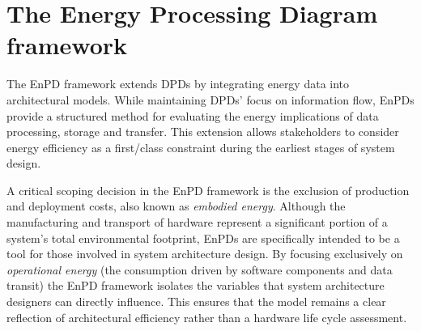 \documentclass[11pt,a4paper]{article}
\begin{document}
\section{The Energy Processing Diagram framework}
The EnPD framework extends DPDs by integrating energy data into architectural models.
While maintaining DPDs' focus on information flow, EnPDs provide a structured method for evaluating the energy implications of data processing, storage and transfer.
This extension allows stakeholders to consider energy efficiency as a first\-/class constraint during the earliest stages of system design.

A critical scoping decision in the EnPD framework is the exclusion of production and deployment costs, also known as \emph{embodied energy}.
Although the manufacturing and transport of hardware represent a significant portion of a system's total environmental footprint, EnPDs are specifically intended to be a tool for those involved in system architecture design.
By focusing exclusively on \emph{operational energy} (the consumption driven by software components and data transit) the EnPD framework isolates the variables that system architecture designers can directly influence.
This ensures that the model remains a clear reflection of architectural efficiency rather than a hardware life cycle assessment.
\end{document}
